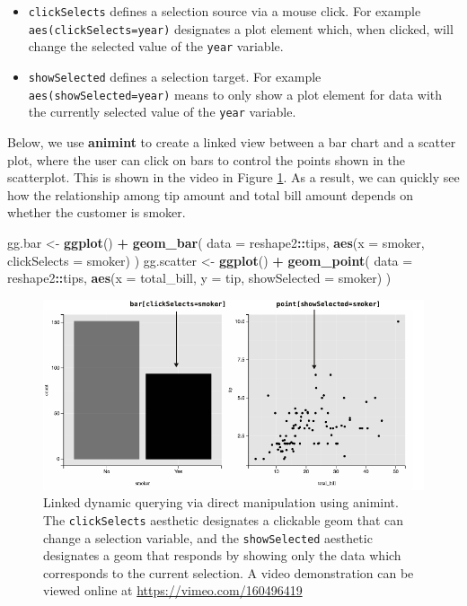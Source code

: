 \documentclass[12pt,]{article}
\newenvironment{Shaded}{\begin{snugshade}}{\end{snugshade}}
\newcommand{\DataTypeTok}[1]{\textcolor[rgb]{0.13,0.29,0.53}{#1}}
\newcommand{\KeywordTok}[1]{\textcolor[rgb]{0.13,0.29,0.53}{\textbf{#1}}}
\newcommand{\NormalTok}[1]{#1}
\newcommand{\OperatorTok}[1]{\textcolor[rgb]{0.81,0.36,0.00}{\textbf{#1}}}
\newcommand{\StringTok}[1]{\textcolor[rgb]{0.31,0.60,0.02}{#1}}
\providecommand{\tightlist}{%
  \setlength{\itemsep}{0pt}\setlength{\parskip}{0pt}}
\theoremstyle{definition}
\theoremstyle{definition}
\theoremstyle{definition}
\theoremstyle{remark}
\begin{document}
\begin{itemize}
\tightlist
\item
  \texttt{clickSelects} defines a selection source via a mouse click.
  For example \texttt{aes(clickSelects=year)} designates a plot element
  which, when clicked, will change the selected value of the
  \texttt{year} variable.
\item
  \texttt{showSelected} defines a selection target. For example
  \texttt{aes(showSelected=year)} means to only show a plot element for
  data with the currently selected value of the \texttt{year} variable.
\end{itemize}

Below, we use \textbf{animint} to create a linked view between a bar
chart and a scatter plot, where the user can click on bars to control
the points shown in the scatterplot. This is shown in the video in
Figure \ref{fig:tips}. As a result, we can quickly see how the
relationship among tip amount and total bill amount depends on whether
the customer is smoker.

\begin{Shaded}
\begin{Highlighting}[]
\NormalTok{gg.bar <-}\StringTok{ }\KeywordTok{ggplot}\NormalTok{() }\OperatorTok{+}\StringTok{ }\KeywordTok{geom_bar}\NormalTok{(}
  \DataTypeTok{data =}\NormalTok{ reshape2}\OperatorTok{::}\NormalTok{tips, }
  \KeywordTok{aes}\NormalTok{(}\DataTypeTok{x =}\NormalTok{ smoker, }\DataTypeTok{clickSelects =}\NormalTok{ smoker)}
\NormalTok{)}
\NormalTok{gg.scatter <-}\StringTok{ }\KeywordTok{ggplot}\NormalTok{() }\OperatorTok{+}\StringTok{ }\KeywordTok{geom_point}\NormalTok{(}
  \DataTypeTok{data =}\NormalTok{ reshape2}\OperatorTok{::}\NormalTok{tips, }
  \KeywordTok{aes}\NormalTok{(}\DataTypeTok{x =}\NormalTok{ total_bill, }\DataTypeTok{y =}\NormalTok{ tip, }
      \DataTypeTok{showSelected =}\NormalTok{ smoker)}
\NormalTok{)}
\end{Highlighting}
\end{Shaded}

\begin{figure}
\centering
\includegraphics{images/figure-tips}
\caption{\label{fig:tips}Linked dynamic querying via direct manipulation
using animint. The \texttt{clickSelects} aesthetic designates a
clickable geom that can change a selection variable, and the
\texttt{showSelected} aesthetic designates a geom that responds by
showing only the data which corresponds to the current selection. A
video demonstration can be viewed online at
\url{https://vimeo.com/160496419}}
\end{figure}
\end{document}
